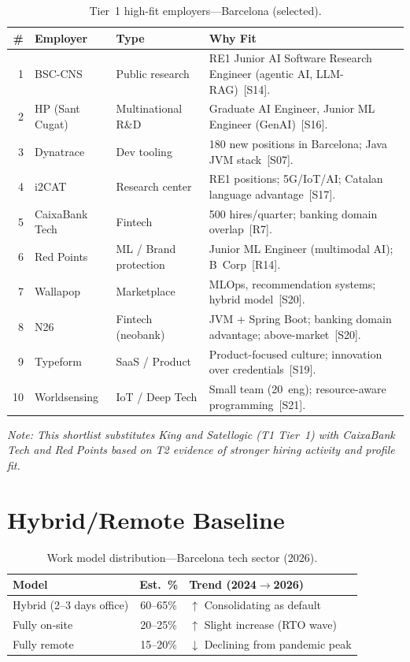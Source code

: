 \documentclass[a4paper,11pt,openany]{report}
\begin{document}
\begin{table}[htbp]
\centering
\caption{Tier~1 high-fit employers---Barcelona (selected).}
\label{tab:employers-t1}
\small
\begin{tabularx}{\textwidth}{r l l X}
\toprule
\textbf{\#} & \textbf{Employer} & \textbf{Type} & \textbf{Why Fit} \\
\midrule
1  & BSC-CNS          & Public research      & RE1 Junior AI Software Research Engineer (agentic AI, LLM-RAG)~[S14]. \\
2  & HP (Sant Cugat)  & Multinational R\&D   & Graduate AI Engineer, Junior ML Engineer (GenAI)~[S16]. \\
3  & Dynatrace        & Dev tooling          & 180 new positions in Barcelona; Java JVM stack~[S07]. \\
4  & i2CAT            & Research center      & RE1 positions; 5G/IoT/AI; Catalan language advantage~[S17]. \\
5  & CaixaBank Tech   & Fintech              & 500 hires/quarter; banking domain overlap~[R7]. \\
6  & Red Points       & ML / Brand protection& Junior ML Engineer (multimodal AI); B~Corp~[R14]. \\
7  & Wallapop         & Marketplace          & MLOps, recommendation systems; hybrid model~[S20]. \\
8  & N26              & Fintech (neobank)    & JVM + Spring Boot; banking domain advantage; above-market~[S20]. \\
9  & Typeform         & SaaS / Product       & Product-focused culture; innovation over credentials~[S19]. \\
10 & Worldsensing     & IoT / Deep Tech      & Small team (20~eng); resource-aware programming~[S21]. \\
\bottomrule
\end{tabularx}
\end{table}

\noindent\textit{Note: This shortlist substitutes King and Satellogic (T1 Tier~1) with CaixaBank Tech and Red Points based on T2 evidence of stronger hiring activity and profile fit.}

\section{Hybrid/Remote Baseline}

\begin{table}[htbp]
\centering
\caption{Work model distribution---Barcelona tech sector (2026).}
\label{tab:remote}
\begin{tabular}{l c l}
\toprule
\textbf{Model} & \textbf{Est.\ \%} & \textbf{Trend (2024$\to$2026)} \\
\midrule
Hybrid (2--3 days office) & 60--65\% & $\uparrow$ Consolidating as default \\
Fully on-site             & 20--25\% & $\uparrow$ Slight increase (RTO wave) \\
Fully remote              & 15--20\% & $\downarrow$ Declining from pandemic peak \\
\bottomrule
\end{tabular}
\end{table}
\end{document}
